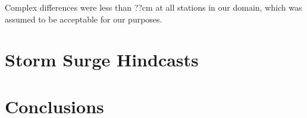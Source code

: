 \documentclass[pdftex,10pt]{article}
\begin{document}
Complex differences were less than ??cm at all stations in our domain, which was assumed to be acceptable for our purposes. 

\section{Storm Surge Hindcasts}\label{sec:storm}

\section{Conclusions}\label{sec:conclusions}




\end{document}
